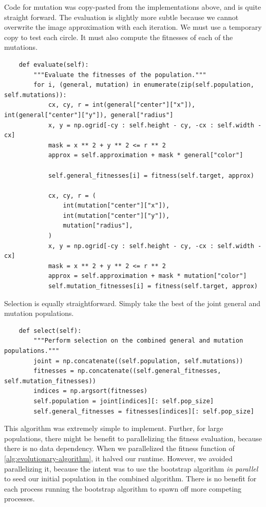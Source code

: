 \documentclass{article}
\begin{document}
Code for mutation was copy-pasted from the implementations above, and is quite straight forward. The evaluation is slightly more subtle because we cannot overwrite the image approximation with each iteration. We must use a temporary copy to test each circle. It must also compute the fitnesses of each of the mutations.

\begin{verbatim}
    def evaluate(self):
        """Evaluate the fitnesses of the population."""
        for i, (general, mutation) in enumerate(zip(self.population, self.mutations)):
            cx, cy, r = int(general["center"]["x"]), int(general["center"]["y"]), general["radius"]
            x, y = np.ogrid[-cy : self.height - cy, -cx : self.width - cx]
            mask = x ** 2 + y ** 2 <= r ** 2
            approx = self.approximation + mask * general["color"]

            self.general_fitnesses[i] = fitness(self.target, approx)

            cx, cy, r = (
                int(mutation["center"]["x"]),
                int(mutation["center"]["y"]),
                mutation["radius"],
            )
            x, y = np.ogrid[-cy : self.height - cy, -cx : self.width - cx]
            mask = x ** 2 + y ** 2 <= r ** 2
            approx = self.approximation + mask * mutation["color"]
            self.mutation_fitnesses[i] = fitness(self.target, approx)
\end{verbatim}

Selection is equally straightforward. Simply take the best of the joint general and mutation populations.

\begin{verbatim}
    def select(self):
        """Perform selection on the combined general and mutation populations."""
        joint = np.concatenate((self.population, self.mutations))
        fitnesses = np.concatenate((self.general_fitnesses, self.mutation_fitnesses))
        indices = np.argsort(fitnesses)
        self.population = joint[indices][: self.pop_size]
        self.general_fitnesses = fitnesses[indices][: self.pop_size]
\end{verbatim}

This algorithm was extremely simple to implement. Further, for large populations, there might be benefit to parallelizing the fitness evaluation, because there is no data dependency. When we parallelized the fitness function of \autoref{alg:evolutionary-algorithm}, it halved our runtime. However, we avoided parallelizing it, because the intent was to use the bootstrap algorithm \textit{in parallel} to seed our initial population in the combined algorithm. There is no benefit for each process running the bootstrap algorithm to spawn off more competing processes.
\end{document}
